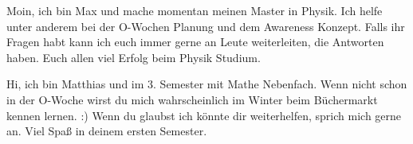 \begin{multicols}{2}
{
Moin, ich bin Max und mache momentan meinen Master in Physik. Ich helfe unter anderem bei der O-Wochen Planung und dem Awareness Konzept. Falls ihr Fragen habt kann ich euch immer gerne an Leute weiterleiten, die Antworten haben. Euch allen viel Erfolg beim Physik Studium. 
}

\vspace{-0.1cm}

{
Hi, ich bin Matthias und im 3. Semester mit Mathe Nebenfach. Wenn nicht schon in der O-Woche wirst du mich wahrscheinlich  im Winter beim Büchermarkt kennen lernen. :) 
Wenn du glaubst ich könnte dir weiterhelfen, sprich mich gerne an. Viel Spaß in deinem ersten Semester.  
}


\end{multicols}
